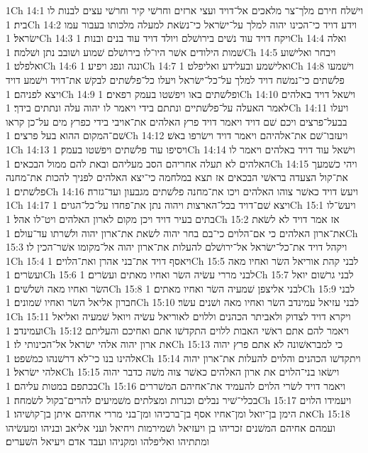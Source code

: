 1Ch 14:1  וישׁלח חירם מלך־צר מלאכים אל־דויד ועצי ארזים וחרשׁי קיר וחרשׁי עצים לבנות לו בית׃
1Ch 14:2  וידע דויד כי־הכינו יהוה למלך על־ישׂראל כי־נשׂאת למעלה מלכותו בעבור עמו ישׂראל׃
1Ch 14:3  ויקח דויד עוד נשׁים בירושׁלם ויולד דויד עוד בנים ובנות׃
1Ch 14:4  ואלה שׁמות הילודים אשׁר היו־לו בירושׁלם שׁמוע ושׁובב נתן ושׁלמה׃
1Ch 14:5  ויבחר ואלישׁוע ואלפלט׃
1Ch 14:6  ונגה ונפג ויפיע׃
1Ch 14:7  ואלישׁמע ובעלידע ואליפלט׃
1Ch 14:8  וישׁמעו פלשׁתים כי־נמשׁח דויד למלך על־כל־ישׂראל ויעלו כל־פלשׁתים לבקשׁ את־דויד וישׁמע דויד ויצא לפניהם׃
1Ch 14:9  ופלשׁתים באו ויפשׁטו בעמק רפאים׃
1Ch 14:10  וישׁאל דויד באלהים לאמר האעלה על־פלשׁתיים ונתתם בידי ויאמר לו יהוה עלה ונתתים בידך׃
1Ch 14:11  ויעלו בבעל־פרצים ויכם שׁם דויד ויאמר דויד פרץ האלהים את־אויבי בידי כפרץ מים על־כן קראו שׁם־המקום ההוא בעל פרצים׃
1Ch 14:12  ויעזבו־שׁם את־אלהיהם ויאמר דויד וישׂרפו באשׁ׃
1Ch 14:13  ויסיפו עוד פלשׁתים ויפשׁטו בעמק׃
1Ch 14:14  וישׁאל עוד דויד באלהים ויאמר לו האלהים לא תעלה אחריהם הסב מעליהם ובאת להם ממול הבכאים׃
1Ch 14:15  ויהי כשׁמעך את־קול הצעדה בראשׁי הבכאים אז תצא במלחמה כי־יצא האלהים לפניך להכות את־מחנה פלשׁתים׃
1Ch 14:16  ויעשׂ דויד כאשׁר צוהו האלהים ויכו את־מחנה פלשׁתים מגבעון ועד־גזרה׃
1Ch 14:17  ויצא שׁם־דויד בכל־הארצות ויהוה נתן את־פחדו על־כל־הגוים׃
1Ch 15:1  ויעשׂ־לו בתים בעיר דויד ויכן מקום לארון האלהים ויט־לו אהל׃
1Ch 15:2  אז אמר דויד לא לשׂאת את־ארון האלהים כי אם־הלוים כי־בם בחר יהוה לשׂאת את־ארון יהוה ולשׁרתו עד־עולם׃
1Ch 15:3  ויקהל דויד את־כל־ישׂראל אל־ירושׁלם להעלות את־ארון יהוה אל־מקומו אשׁר־הכין לו׃
1Ch 15:4  ויאסף דויד את־בני אהרן ואת־הלוים׃
1Ch 15:5  לבני קהת אוריאל השׂר ואחיו מאה ועשׂרים׃
1Ch 15:6  לבני מררי עשׂיה השׂר ואחיו מאתים ועשׂרים׃
1Ch 15:7  לבני גרשׁום יואל השׂר ואחיו מאה ושׁלשׁים׃
1Ch 15:8  לבני אליצפן שׁמעיה השׂר ואחיו מאתים׃
1Ch 15:9  לבני חברון אליאל השׂר ואחיו שׁמונים׃
1Ch 15:10  לבני עזיאל עמינדב השׂר ואחיו מאה ושׁנים עשׂר׃
1Ch 15:11  ויקרא דויד לצדוק ולאביתר הכהנים וללוים לאוריאל עשׂיה ויואל שׁמעיה ואליאל ועמינדב׃
1Ch 15:12  ויאמר להם אתם ראשׁי האבות ללוים התקדשׁו אתם ואחיכם והעליתם את ארון יהוה אלהי ישׂראל אל־הכינותי לו׃
1Ch 15:13  כי למבראשׁונה לא אתם פרץ יהוה אלהינו בנו כי־לא דרשׁנהו כמשׁפט׃
1Ch 15:14  ויתקדשׁו הכהנים והלוים להעלות את־ארון יהוה אלהי ישׂראל׃
1Ch 15:15  וישׂאו בני־הלוים את ארון האלהים כאשׁר צוה משׁה כדבר יהוה בכתפם במטות עליהם׃
1Ch 15:16  ויאמר דויד לשׂרי הלוים להעמיד את־אחיהם המשׁררים בכלי־שׁיר נבלים וכנרות ומצלתים משׁמיעים להרים־בקול לשׂמחה׃
1Ch 15:17  ויעמידו הלוים את הימן בן־יואל ומן־אחיו אסף בן־ברכיהו ומן־בני מררי אחיהם איתן בן־קושׁיהו׃
1Ch 15:18  ועמהם אחיהם המשׁנים זכריהו בן ויעזיאל ושׁמירמות ויחיאל ועני אליאב ובניהו ומעשׂיהו ומתתיהו ואליפלהו ומקניהו ועבד אדם ויעיאל השׁערים׃
